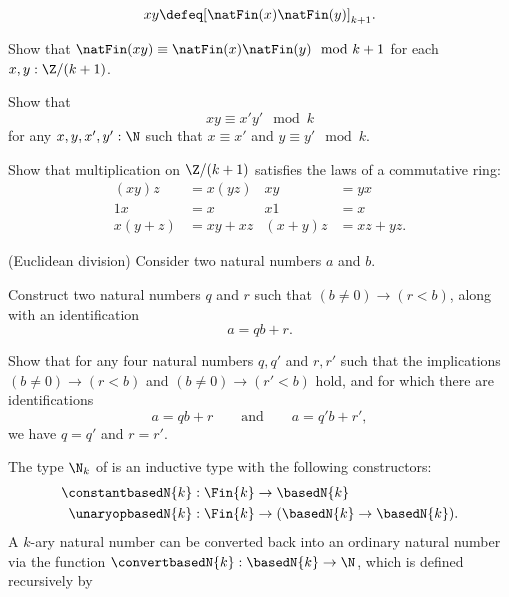 \begin{exercises}
\begin{equation*}
    xy \defeq [\natFin(x)\natFin(y)]_{k+1}.
  \end{equation*}
  \begin{subexenum}
  \item Show that $\natFin(xy)\equiv\natFin(x)\natFin(y)\mod{k+1}$ for each $x,y:\Z/{(k+1)}$.
  \item \label{ex:congruence-mulN}Show that
    \begin{equation*}
      xy\equiv x'y'\mod k
    \end{equation*}
    for any $x,y,x',y':\N$ such that $x\equiv x'$ and $y\equiv y' \mod k$.
  \item Show that multiplication on $\Z/{(k+1)}$ satisfies the laws of a commutative ring:
    \begin{align*}
      (xy)z & = x(yz) & xy & = yx \\
      1x & = x & x1 & = x \\
      x(y+z) & = xy+xz & (x+y)z & = xz+yz.
    \end{align*}
  \end{subexenum}
  \exitem \label{ex:euclidean-division}(Euclidean division) Consider two natural numbers $a$ and $b$.
  \begin{subexenum}
  \item Construct two natural numbers $q$ and $r$ such that $(b\neq 0) \to (r<b)$, along with an identification
    \begin{equation*}
      a=qb+r.
    \end{equation*}
  \item Show that for any four natural numbers $q,q'$ and $r,r'$ such that the implications $(b\neq 0) \to (r<b)$ and $(b\neq 0)\to (r'<b)$ hold, and for which there are identifications
    \begin{equation*}
      a=qb+r\qquad\text{and}\qquad a=q'b+r',
    \end{equation*}
    we have $q=q'$ and $r=r'$.
  \end{subexenum}
  \exitem The type $\N_k$ of  is an inductive type with the following constructors:
  \begin{align*}
    \constantbasedN{k} & : \Fin{k}\to\basedN{k} \\
    \unaryopbasedN{k} & : \Fin{k}\to (\basedN{k}\to\basedN{k}).
  \end{align*}
  A $k$-ary natural number can be converted back into an ordinary natural number via the function $\convertbasedN{k}:\basedN{k}\to\N$, which is defined recursively by
  \begin{align*}

\end{align*}
\end{exercises}
